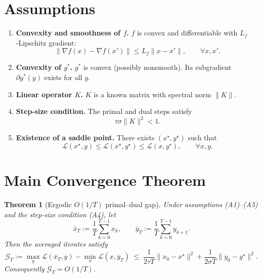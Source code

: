 \documentclass{article}
\newtheorem{theorem}{Theorem}
\begin{document}
\section*{Assumptions}
\begin{enumerate}
\item \textbf{Convexity and smoothness of $f$.}  
   $f$ is convex and differentiable with $L_{f}$‑Lipschitz gradient:
   \[
   \|\nabla f(x)-\nabla f(x')\|\le L_{f}\|x-x'\|,\qquad\forall x,x'.
   \tag{A1}
   \]
\item \textbf{Convexity of $g^{*}$.}  
   $g^{*}$ is convex (possibly nonsmooth). Its subgradient $\partial g^{*}(y)$ exists for all $y$.
\item \textbf{Linear operator $K$.}  
   $K$ is a known matrix with spectral norm $\|K\|$.
\item \textbf{Step‑size condition.}  
   The primal and dual steps satisfy
   \[
   \tau\sigma\|K\|^{2}<1 .
   \tag{A4}
   \]
\item \textbf{Existence of a saddle point.}  
   There exists $(x^{\star},y^{\star})$ such that
   \[
   \mathcal L(x^{\star},y)\le\mathcal L(x^{\star},y^{\star})\le\mathcal L(x,y^{\star}),
   \qquad\forall x,y .
   \tag{A5}
   \]
\end{enumerate}

\section*{Main Convergence Theorem}
\begin{theorem}[Ergodic $O(1/T)$ primal–dual gap]\label{thm:rate}
Under assumptions (A1)–(A5) and the step‑size condition (A4), let
\[
\bar x_{T}:=\frac{1}{T}\sum_{k=0}^{T-1}x_{k},\qquad
\bar y_{T}:=\frac{1}{T}\sum_{k=0}^{T-1}y_{k+1}.
\]
Then the averaged iterates satisfy
\[
\boxed{
\mathcal G_{T}:=
\max_{y}\mathcal L(\bar x_{T},y)-\min_{x}\mathcal L(x,\bar y_{T})
\;\le\;
\frac{1}{2\tau T}\|x_{0}-x^{\star}\|^{2}
+\frac{1}{2\sigma T}\|y_{0}-y^{\star}\|^{2}.
}
\tag{5}
\]
Consequently $\mathcal G_{T}=O(1/T)$.
\end{theorem}
\end{document}
